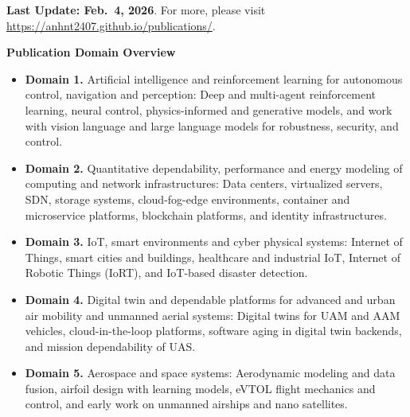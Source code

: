 

\setcounter{domainctr}{0}

\newcommand{\domainheading}[1]{%
  \stepcounter{domainctr}%
  {
\normalsize\bfseries\textcolor{blue}{\Alph{domainctr}. #1}}%
}


\newenvironment{pubenumerate}{%
  \begin{enumerate}
    \setcounter{enumi}{\value{pubctr}}%
}{%
    \setcounter{pubctr}{\value{enumi}}%
  \end{enumerate}
}

{\footnotesize
\textbf{Last Update: Feb.\ 4, 2026}. For more, please visit \url{https://anhnt2407.github.io/publications/}.

\bigskip
\textbf{Publication Domain Overview}
\begin{itemize}
  \item \textbf{Domain 1.} Artificial intelligence and reinforcement learning for autonomous control, navigation and perception: Deep and multi-agent reinforcement learning, neural control, physics-informed and generative models, and work with vision language and large language models for robustness, security, and control.
  \item \textbf{Domain 2.} Quantitative dependability, performance and energy modeling of computing and network infrastructures: Data centers, virtualized servers, SDN, storage systems, cloud-fog-edge environments, container and microservice platforms, blockchain platforms, and identity infrastructures.
  \item \textbf{Domain 3.} IoT, smart environments and cyber physical systems: Internet of Things, smart cities and buildings, healthcare and industrial IoT, Internet of Robotic Things (IoRT), and IoT-based disaster detection.
  \item \textbf{Domain 4.} Digital twin and dependable platforms for advanced and urban air mobility and unmanned aerial systems: Digital twins for UAM and AAM vehicles, cloud-in-the-loop platforms, software aging in digital twin backends, and mission dependability of UAS.
  \item \textbf{Domain 5.} Aerospace and space systems: Aerodynamic modeling and data fusion, airfoil design with learning models, eVTOL flight mechanics and control, and early work on unmanned airships and nano satellites.
\end{itemize}
\bigskip

}
